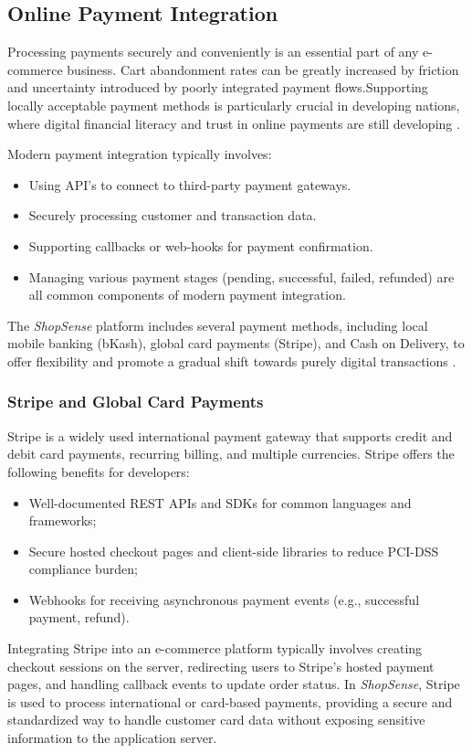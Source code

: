 \subsection{Online Payment Integration}
Processing payments securely and conveniently is an essential part of any e-commerce business. Cart abandonment rates can be greatly increased by friction and uncertainty introduced by poorly integrated payment flows\cite{lee2020checkout}.Supporting locally acceptable payment methods is particularly crucial in developing nations, where digital financial literacy and trust in online payments are still developing \cite{hasan2021mobile}. 

Modern payment integration typically involves:
\begin{itemize}
  \item Using API's to connect to third-party payment gateways.
  \item Securely processing customer and transaction data.
  \item Supporting callbacks or web-hooks for payment confirmation.
  \item Managing various payment stages (pending, successful, failed, refunded) are all common components of modern payment integration.
\end{itemize}
The \textit{ShopSense} platform includes several payment methods, including local mobile banking (bKash), global card payments (Stripe), and Cash on Delivery, to offer flexibility and promote a gradual shift towards purely digital transactions \cite{hasan2021mobile}. 

\subsubsection{Stripe and Global Card Payments}
Stripe is a widely used international payment gateway that supports credit and debit card payments, recurring billing, and multiple currencies. Stripe offers the following benefits for developers:
\begin{itemize}
  \item Well-documented REST APIs and SDKs for common languages and frameworks;
  \item Secure hosted checkout pages and client-side libraries to reduce PCI-DSS compliance burden;
  \item Webhooks for receiving asynchronous payment events (e.g., successful payment, refund).
\end{itemize}

Integrating Stripe into an e-commerce platform typically involves creating checkout sessions on the server, redirecting users to Stripe's hosted payment pages, and handling callback events to update order status. In \textit{ShopSense}, Stripe is used to process international or card-based payments, providing a secure and standardized way to handle customer card data without exposing sensitive information to the application server.

